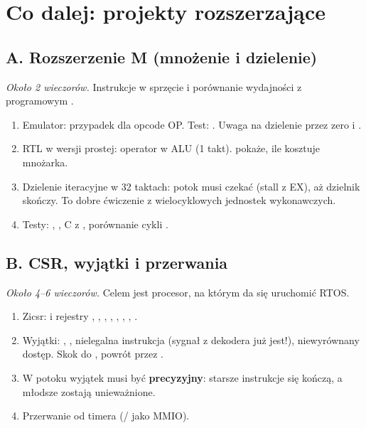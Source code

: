 \chapter{Co dalej: projekty rozszerzające}
\label{ch:dalej}


\section{A. Rozszerzenie M (mnożenie i dzielenie)}
\emph{Około 2 wieczorów.} Instrukcje  w sprzęcie i porównanie wydajności z programowym .
\begin{enumerate}
  \item Emulator: przypadek  dla opcode OP. Test:
    . Uwaga na dzielenie przez zero i
    .
  \item RTL w wersji prostej: operator \code{*} w ALU (1 takt). 
    pokaże, ile kosztuje mnożarka.
  \item Dzielenie iteracyjne w 32 taktach: potok musi czekać (stall z EX), aż
    dzielnik skończy. To dobre ćwiczenie z wielocyklowych jednostek wykonawczych.
  \item Testy: , ,
    C z , porównanie cykli .
\end{enumerate}

\section{B. CSR, wyjątki i przerwania}
\emph{Około 4--6 wieczorów.} Celem jest procesor, na którym da się uruchomić RTOS.
\begin{enumerate}
  \item Zicsr:  i rejestry , ,
    , , , , , .
  \item Wyjątki: , , nielegalna instrukcja (sygnał
     z dekodera już jest!), niewyrównany dostęp. Skok do ,
    powrót przez .
  \item W potoku wyjątek musi być \textbf{precyzyjny}: starsze instrukcje się
    kończą, a młodsze zostają unieważnione.
  \item Przerwanie od timera (/ jako MMIO).
\end{enumerate}

